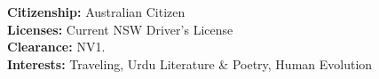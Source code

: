 


\textbf{Citizenship:} Australian Citizen \\
\textbf{Licenses:} Current NSW Driver’s License \\
\textbf{Clearance:} NV1. \\
\textbf{Interests:} Traveling, Urdu Literature \& Poetry, Human Evolution






